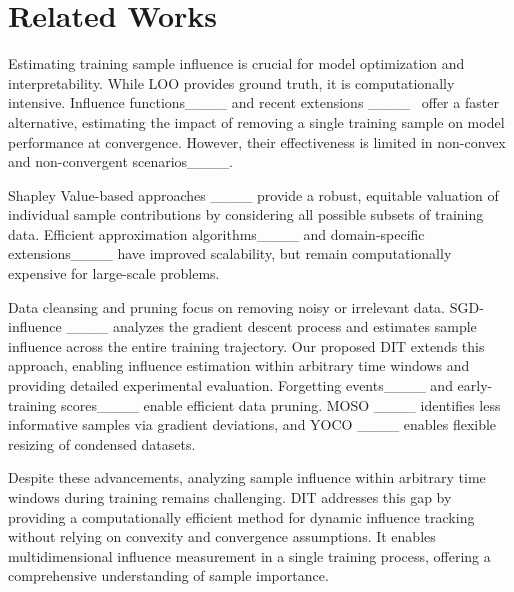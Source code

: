 \section{Related Works}
Estimating training sample influence is crucial for model optimization and interpretability. While LOO provides ground truth, it is computationally intensive. Influence functions____ and recent extensions ____  offer a faster alternative, estimating the impact of removing a single training sample on model performance at convergence. However, their effectiveness is limited in non-convex and non-convergent scenarios____. 

Shapley Value-based approaches ____ provide a robust, equitable valuation of individual sample contributions by considering all possible subsets of training data. Efficient approximation algorithms____ and domain-specific extensions____ have improved scalability, but remain computationally expensive for large-scale problems.

Data cleansing and pruning focus on removing noisy or irrelevant data. SGD-influence ____ analyzes the gradient descent process and estimates sample influence across the entire training trajectory. Our proposed DIT extends this approach, enabling influence estimation within arbitrary time windows and providing detailed experimental evaluation. Forgetting events____ and early-training scores____ enable efficient data pruning. MOSO ____ identifies less informative samples via gradient deviations, and YOCO ____ enables flexible resizing of condensed datasets.

Despite these advancements, analyzing sample influence within arbitrary time windows during training remains challenging. DIT addresses this gap by providing a computationally efficient method for dynamic influence tracking without relying on convexity and convergence assumptions. It enables multidimensional influence measurement in a single training process, offering a comprehensive understanding of sample importance.